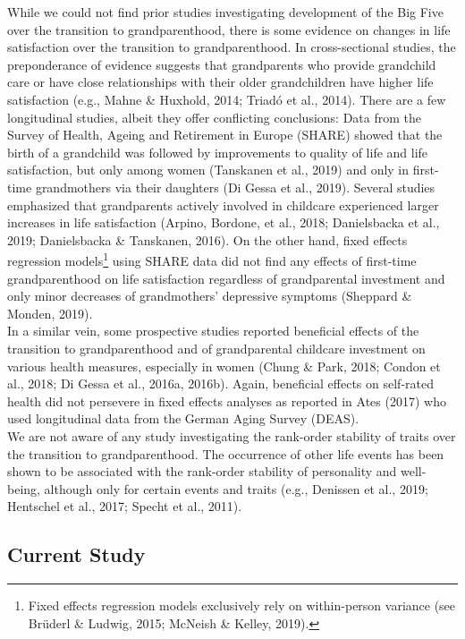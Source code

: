 \documentclass[
  english,
  man, noextraspace]{apa7}
\begin{document}
While we could not find prior studies investigating development of the Big Five over the transition to grandparenthood, there is some evidence on changes in life satisfaction over the transition to grandparenthood. In cross-sectional studies, the preponderance of evidence suggests that grandparents who provide grandchild care or have close relationships with their older grandchildren have higher life satisfaction (e.g., Mahne \& Huxhold, 2014; Triadó et al., 2014). There are a few longitudinal studies, albeit they offer conflicting conclusions: Data from the Survey of Health, Ageing and Retirement in Europe (SHARE) showed that the birth of a grandchild was followed by improvements to quality of life and life satisfaction, but only among women (Tanskanen et al., 2019) and only in first-time grandmothers via their daughters (Di Gessa et al., 2019). Several studies emphasized that grandparents actively involved in childcare experienced larger increases in life satisfaction (Arpino, Bordone, et al., 2018; Danielsbacka et al., 2019; Danielsbacka \& Tanskanen, 2016). On the other hand, fixed effects regression models\footnote{Fixed effects regression models exclusively rely on within-person variance (see Brüderl \& Ludwig, 2015; McNeish \& Kelley, 2019).} using SHARE data did not find any effects of first-time grandparenthood on life satisfaction regardless of grandparental investment and only minor decreases of grandmothers' depressive symptoms (Sheppard \& Monden, 2019).\\
In a similar vein, some prospective studies reported beneficial effects of the transition to grandparenthood and of grandparental childcare investment on various health measures, especially in women (Chung \& Park, 2018; Condon et al., 2018; Di Gessa et al., 2016a, 2016b). Again, beneficial effects on self-rated health did not persevere in fixed effects analyses as reported in Ates (2017) who used longitudinal data from the German Aging Survey (DEAS).\\
We are not aware of any study investigating the rank-order stability of traits over the transition to grandparenthood. The occurrence of other life events has been shown to be associated with the rank-order stability of personality and well-being, although only for certain events and traits (e.g., Denissen et al., 2019; Hentschel et al., 2017; Specht et al., 2011).

\hypertarget{current-study}{%
\subsection{Current Study}\label{current-study}}
\end{document}
